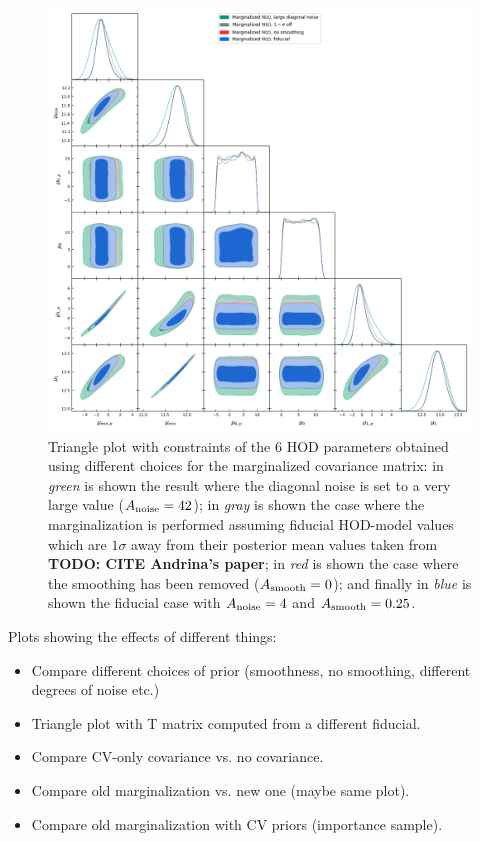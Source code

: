 \documentclass[a4paper,11pt]{article}
\newcommand{\todo}[1]{{\bf TODO: #1}}
\begin{document}
\begin{figure}[ht]
\centering  
\includegraphics[width=1.\textwidth]{./triangle_marg_tests.png}
\caption{Triangle plot with constraints of the 6 HOD parameters obtained using different choices for the marginalized covariance matrix: in \textit{green} is shown the result where the diagonal noise is set to a very large value ($A_{\rm noise} = 42$); in \textit{gray} is shown the case where the marginalization is performed assuming fiducial HOD-model values which are $1\sigma$ away from their posterior mean values taken from \todo{CITE Andrina's paper}; in \textit{red} is shown the case where the smoothing has been removed ($A_{\rm smooth} = 0$); and finally in \textit{blue} is shown the fiducial case with $A_{\rm noise} = 4$ and $A_{\rm smooth} = 0.25$.}
\label{fig:triangle_marg_tests}
\end{figure}

Plots showing the effects of different things:
\begin{itemize}
\item Compare different choices of prior (smoothness, no smoothing, different degrees of noise etc.)
\item Triangle plot with T matrix computed from a different fiducial.
\item Compare CV-only covariance vs. no covariance.
\item Compare old marginalization vs. new one (maybe same plot).
\item Compare old marginalization with CV priors (importance sample).
\end{itemize}
\end{document}
